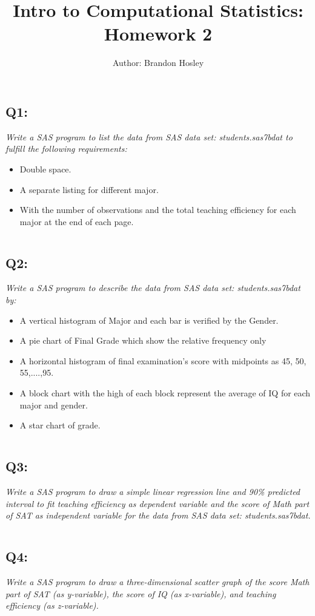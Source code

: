 \documentclass[a4paper,man,natbib]{apa6}
\title{Intro to Computational Statistics: Homework 2}
\author{Author: Brandon Hosley}
\affiliation{Instructor: Liang Kong, Ph.D}
\begin{document}
\maketitle
\singlespacing
	
\subsection*{Q1:}
\emph{Write a SAS program to list the data from SAS data set: students.sas7bdat to fulfill the following requirements:}
\begin{itemize}
	\itemsep-0.5em
	\item Double space.
	\item A separate listing for different major.
	\item With the number of observations and the total teaching efficiency for each major at the end of each page. 
\end{itemize}
	\inputminted[bgcolor=light-gray]{sas}{./Snippets/DAT502-HW2-1.sas}

\subsection*{Q2:}
\emph{Write a SAS program to describe the data from SAS data set: students.sas7bdat by:}
\begin{itemize}
	\itemsep-0.5em
	\item A vertical histogram of Major and each bar is verified by the Gender.
	\item A pie chart of Final Grade which show the relative frequency only
	\item A horizontal histogram of final examination's score with midpoints as 45, 50, 55,....,95.
	\item A block chart with the high of each block represent the average of IQ for each major and gender.
	\item A star chart of grade.
\end{itemize}
	\inputminted[bgcolor=light-gray]{sas}{./Snippets/DAT502-HW2-2.sas}

\subsection*{Q3:}
\emph{Write a SAS program to draw a simple linear regression line and 90\% predicted interval to fit teaching efficiency as dependent variable and the score of Math part of SAT as independent variable for the data from SAS data set: students.sas7bdat. }
	\inputminted[bgcolor=light-gray]{sas}{./Snippets/DAT502-HW2-3.sas}

\subsection*{Q4:}
\emph{Write a SAS program to draw a three-dimensional scatter graph of the score Math part of SAT (as y-variable), the score of IQ (as x-variable), and teaching efficiency (as z-variable).}
	\inputminted[bgcolor=light-gray]{sas}{./Snippets/DAT502-HW2-4.sas}
	
\end{document}
